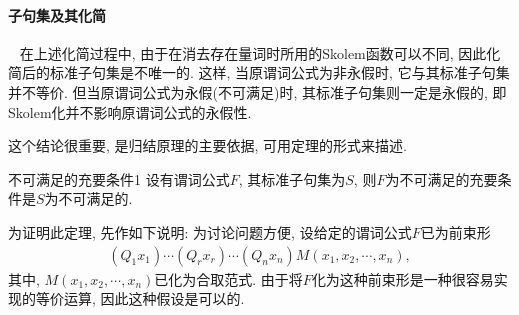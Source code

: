 \paragraph{子句集及其化简}~{}
在上述化简过程中, 由于在消去存在量词时所用的Skolem函数可以不同, 因此化简后的标准子句集是不唯一的.
这样, 当原谓词公式为非永假时, 它与其标准子句集并不等价. 但当原谓词公式为永假(不可满足)时, 其标准子句集则一定是永假的, 即Skolem化并不影响原谓词公式的永假性.

这个结论很重要, 是归结原理的主要依据, 可用定理的形式来描述.

\begin{mythm}{不可满足的充要条件}{1}
设有谓词公式$F$, 其标准子句集为$S$, 则$F$为不可满足的充要条件是$S$为不可满足的.
\end{mythm}

为证明此定理, 先作如下说明:  为讨论问题方便, 设给定的谓词公式$F$已为前束形
\begin{align}
  (Q_1x_1)\cdots (Q_rx_r)\cdots (Q_nx_n)M(x_1,x_2,\cdots,x_n),
\end{align}
其中, $M(x_1,x_2,\cdots,x_n)$已化为合取范式. 由于将$F$化为这种前束形是一种很容易实现的等价运算, 因此这种假设是可以的.

